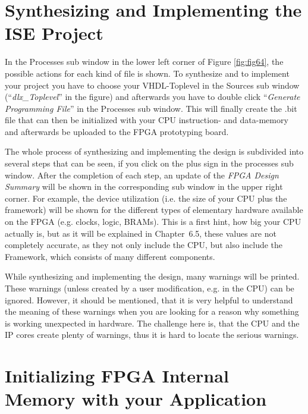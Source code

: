 \hypertarget{synthesizing-and-implementing-the-ise-project}{%
\section{Synthesizing and Implementing the ISE
Project}\label{synthesizing-and-implementing-the-ise-project}}

In the Processes sub window in the lower left corner of
Figure \ref{fig:fig64}, the possible actions for each
kind of file is shown. To synthesize and to implement your project you
have to choose your VHDL-Toplevel in the Sources sub window
(``\emph{dlx\_Toplevel}'' in the figure) and afterwards you have to
double click ``\emph{Generate Programming File}'' in the Processes sub
window. This will finally create the .bit file that can then be
initialized with your CPU instruction- and data-memory and afterwards be
uploaded to the FPGA prototyping board.

The whole process of synthesizing and implementing the design is
subdivided into several steps that can be seen, if you click on the plus
sign in the processes sub window. After the completion of each step, an
update of the \emph{FPGA Design Summary} will be shown in the
corresponding sub window in the upper right corner. For example, the
device utilization (i.e. the size of your CPU plus the framework) will
be shown for the different types of elementary hardware available on the
FPGA (e.g. clocks, logic, BRAMs). This is a first hint, how big your CPU
actually is, but as it will be explained in Chapter~6.5, these values
are not completely accurate, as they not only include the CPU, but also
include the Framework, which consists of many different components.

While synthesizing and implementing the design, many warnings will be
printed. These warnings (unless created by a user modification, e.g. in
the CPU) can be ignored. However, it should be mentioned, that it is
very helpful to understand the meaning of these warnings when you are
looking for a reason why something is working unexpected in hardware.
The challenge here is, that the CPU and the IP cores create plenty of
warnings, thus it is hard to locate the serious warnings.

\hypertarget{initializing-fpga-internal-memory-with-your-application}{%
\section{Initializing FPGA Internal Memory with your
Application}\label{initializing-fpga-internal-memory-with-your-application}}

